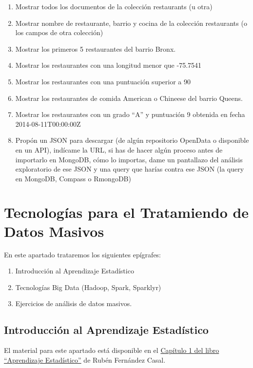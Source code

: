 \documentclass[
]{book}
\begin{document}
\begin{enumerate}
\def\labelenumi{\arabic{enumi}.}
\item
  Mostrar todos los documentos de la colección restaurants (u otra)
\item
  Mostrar nombre de restaurante, barrio y cocina de la colección restaurants (o los campos de otra colección)
\item
  Mostrar los primeros 5 restaurantes del barrio Bronx.
\item
  Mostrar los restaurantes con una longitud menor que -75.7541
\item
  Mostrar los restaurantes con una puntuación superior a 90
\item
  Mostrar los restaurantes de comida American o Chineese del barrio Queens.
\item
  Mostrar los restaurantes con un grado ``A'' y puntuación 9 obtenida en fecha 2014-08-11T00:00:00Z
\item
  Propón un JSON para descargar (de algún repositorio OpenData o disponible en un API), indícame la URL, si has de hacer algún proceso antes de importarlo en MongoDB, cómo lo importas, dame un pantallazo del análisis exploratorio de ese JSON y una query que harías contra ese JSON (la query en MongoDB, Compass o RmongoDB)
\end{enumerate}

\chapter{Tecnologías para el Tratamiendo de Datos Masivos}\label{tecnologuxedas-para-el-tratamiendo-de-datos-masivos}

En este apartado trataremos los siguientes epígrafes:

\begin{enumerate}
\def\labelenumi{\arabic{enumi}.}
\item
  Introducción al Aprendizaje Estadístico
\item
  Tecnologías Big Data (Hadoop, Spark, Sparklyr)
\item
  Ejercicios de análisis de datos masivos.
\end{enumerate}

\section{Introducción al Aprendizaje Estadístico}\label{introducciuxf3n-al-aprendizaje-estaduxedstico}

El material para este apartado está disponible en el
\href{https://rubenfcasal.github.io/aprendizaje_estadistico/intro-AE.html}{Capítulo 1 del libro ``Aprendizaje Estadístico''} de Rubén Fernández Casal.
\end{document}
